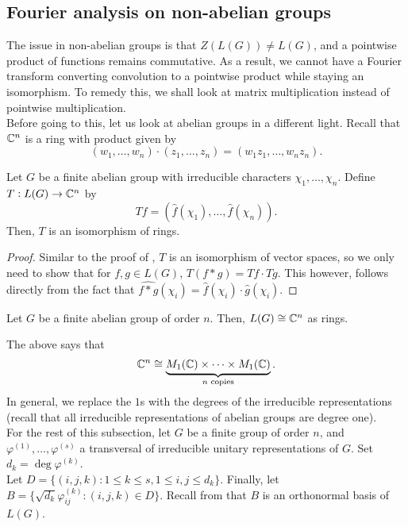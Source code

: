 	\subsection{Fourier analysis on non-abelian groups}

		The issue in non-abelian groups is that $Z(L(G)) \ne L(G)$, and a pointwise product of functions remains commutative. As a result, we cannot have a Fourier transform converting convolution to a pointwise product while staying an isomorphism. To remedy this, we shall look at matrix multiplication instead of pointwise multiplication.\\

		Before going to this, let us look at abelian groups in a different light. Recall that $\mathbb{C}^n$ is a ring with product given by
		\[ (w_1,\ldots,w_n) \cdot (z_1,\ldots,z_n) = (w_1z_1,\ldots,w_nz_n). \]

		\begin{fprop}
			Let $G$ be a finite abelian group with irreducible characters $\chi_1,\ldots,\chi_n$. Define $T : L(G) \to \mathbb{C}^n$ by
			\[ Tf = (\hat{f}(\chi_1),\ldots,\hat{f}(\chi_n)). \]
			Then, $T$ is an isomorphism of rings.
		\end{fprop}
		\begin{proof}
			Similar to the proof of , $T$ is an isomorphism of vector spaces, so we only need to show that for $f,g \in L(G)$, $T(f*g) = Tf\cdot Tg$. This however, follows directly from the fact that $\widehat{f*g}(\chi_i) = \hat{f}(\chi_i) \cdot \hat{g}(\chi_i)$.
		\end{proof}

		\begin{ftheo}
			Let $G$ be a finite abelian group of order $n$. Then, $L(G) \cong \mathbb{C}^n$ as rings.
		\end{ftheo}

		The above says that
		\[ \mathbb{C}^n \cong \underbrace{M_1(\mathbb{C}) \times \cdots \times M_1(\mathbb{C})}_{n\text{ copies}}. \]
		In general, we replace the $1$s with the degrees of the irreducible representations (recall that all irreducible representations of abelian groups are degree one).\\

		For the rest of this subsection, let $G$ be a finite group of order $n$, and $\varphi^{(1)},\ldots,\varphi^{(s)}$ a transversal of irreducible unitary representations of $G$. Set $d_k = \deg \varphi^{(k)}$.\\
		Let $D = \{(i,j,k) : 1 \le k \le s, 1 \le i,j \le d_k\}$. Finally, let $B = \{ \sqrt{d_k} \varphi_{ij}^{(k)} : (i,j,k) \in D \}$. Recall from  that $B$ is an orthonormal basis of $L(G)$.

